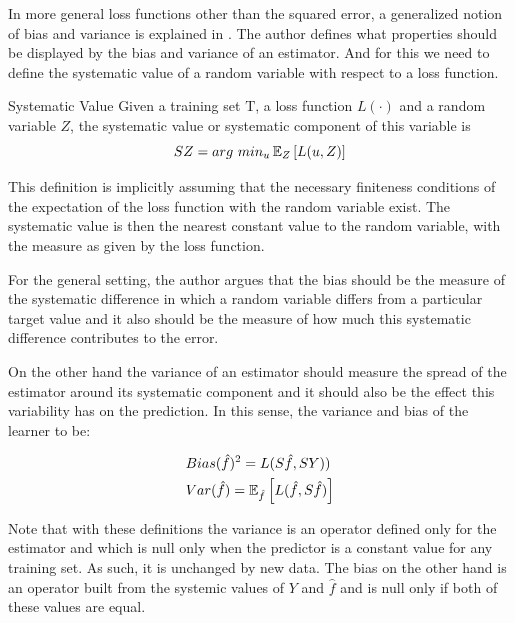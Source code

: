 In more general loss functions other than the squared error, a generalized notion of bias and variance is explained in \textcite{james-biasVarianceGeneral}. The author defines what properties should be displayed by the bias and variance of an estimator. And for this we need to define the systematic value of a random variable with respect to a loss function.

\begin{definition}{Systematic Value}
Given a training set $\mathrm{T}$, a loss function $L(\cdot)$ and a random variable $Z$, the systematic value or systematic component of this variable is
$$ SZ = arg \ min_u \operatorname{\mathbb{E}}_{Z} \left[ L(u,Z) \right]$$
\end{definition}

This definition is implicitly assuming that the necessary finiteness conditions of the expectation of the loss function with the random variable exist. The systematic value is then the nearest constant value to the random variable, with the measure as given by the loss function.


For the general setting, the author argues that the bias should be the measure of the systematic difference in which a random variable differs from a particular target value and it also should be the measure of how much this systematic difference contributes to the error.

On the other hand the variance of an estimator should measure the spread of the estimator around its systematic component and it should also be the effect this variability has on the prediction. In this sense, the variance and bias of the learner to be:

\begin{equation}
\begin{split}
& Bias(\hat{f})^2 = L(S\hat{f},SY)) \\
& Var(\hat{f}) = \operatorname{\mathbb{E}}_{\hat{f}} \left[ L(\hat{f} , S\hat{f}) \right]
\end{split}
\end{equation}

Note that with these definitions the variance is an operator defined only for the estimator and which is null only when the predictor is a constant value for any training set. As such, it is unchanged by new data. The bias on the other hand is an operator built from the systemic values of $Y$ and $\hat{f}$ and is null only if both of these values are equal.


